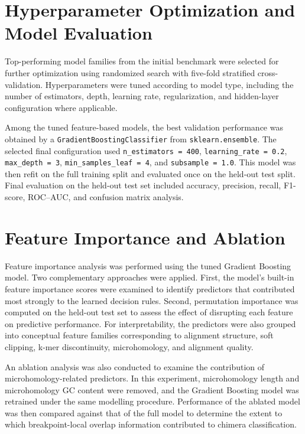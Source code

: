 \section{Hyperparameter Optimization and Model Evaluation}

Top-performing model families from the initial benchmark were selected for further optimization using randomized search with five-fold stratified cross-validation. Hyperparameters were tuned according to model type, including the number of estimators, depth, learning rate, regularization, and hidden-layer configuration where applicable.

Among the tuned feature-based models, the best validation performance was obtained by a \texttt{GradientBoostingClassifier} from \texttt{sklearn.ensemble}. The selected final configuration used \texttt{n\_estimators = 400}, \texttt{learning\_rate = 0.2}, \texttt{max\_depth = 3}, \texttt{min\_samples\_leaf = 4}, and \texttt{subsample = 1.0}. This model was then refit on the full training split and evaluated once on the held-out test split. Final evaluation on the held-out test set included accuracy, precision, recall, F1-score, ROC--AUC, and confusion matrix analysis. 

\section{Feature Importance and Ablation}

Feature importance analysis was performed using the tuned Gradient Boosting model. Two complementary approaches were applied. First, the model’s built-in feature importance scores were examined to identify predictors that contributed most strongly to the learned decision rules. Second, permutation importance was computed on the held-out test set to assess the effect of disrupting each feature on predictive performance. For interpretability, the predictors were also grouped into conceptual feature families corresponding to alignment structure, soft clipping, k-mer discontinuity, microhomology, and alignment quality.

An ablation analysis was also conducted to examine the contribution of microhomology-related predictors. In this experiment, microhomology length and microhomology GC content were removed, and the Gradient Boosting model was retrained under the same modelling procedure. Performance of the ablated model was then compared against that of the full model to determine the extent to which breakpoint-local overlap information contributed to chimera classification.

